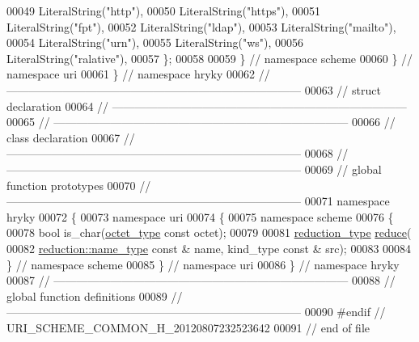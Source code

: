 \begin{DoxyCode}
00049         LiteralString(\textcolor{stringliteral}{"http"}),
00050         LiteralString(\textcolor{stringliteral}{"https"}),
00051         LiteralString(\textcolor{stringliteral}{"fpt"}),
00052         LiteralString(\textcolor{stringliteral}{"ldap"}),
00053         LiteralString(\textcolor{stringliteral}{"mailto"}),
00054         LiteralString(\textcolor{stringliteral}{"urn"}),
00055         LiteralString(\textcolor{stringliteral}{"ws"}),
00056         LiteralString(\textcolor{stringliteral}{"ralative"}),
00057     \};
00058 
00059 \} \textcolor{comment}{// namespace scheme}
00060 \} \textcolor{comment}{// namespace uri}
00061 \} \textcolor{comment}{// namespace hryky}
00062 \textcolor{comment}{//
      ------------------------------------------------------------------------------}
00063 \textcolor{comment}{// struct declaration}
00064 \textcolor{comment}{//
      ------------------------------------------------------------------------------}
00065 \textcolor{comment}{//
      ------------------------------------------------------------------------------}
00066 \textcolor{comment}{// class declaration}
00067 \textcolor{comment}{//
      ------------------------------------------------------------------------------}
00068 \textcolor{comment}{//
      ------------------------------------------------------------------------------}
00069 \textcolor{comment}{// global function prototypes}
00070 \textcolor{comment}{//
      ------------------------------------------------------------------------------}
00071 \textcolor{keyword}{namespace }hryky
00072 \{
00073 \textcolor{keyword}{namespace }uri
00074 \{
00075 \textcolor{keyword}{namespace }scheme
00076 \{
00078     \textcolor{keywordtype}{bool} is\_char(\hyperlink{namespacehryky_a488cba8b666be33ccca70e819684e3c8}{octet_type} \textcolor{keyword}{const} octet);
00079 
00081     \hyperlink{namespacehryky_a343a9a4c36a586be5c2693156200eadc}{reduction_type} \hyperlink{namespacehryky_1_1uri_ab4530b241565d82fb0768bb29031858f}{reduce}(
00082         \hyperlink{namespacehryky_1_1reduction_ac686c30a4c8d196bbd0f05629a6b921f}{reduction::name_type} \textcolor{keyword}{const} & name, kind\_type \textcolor{keyword}{const} & src);
00083 
00084 \} \textcolor{comment}{// namespace scheme}
00085 \} \textcolor{comment}{// namespace uri}
00086 \} \textcolor{comment}{// namespace hryky}
00087 \textcolor{comment}{//
      ------------------------------------------------------------------------------}
00088 \textcolor{comment}{// global function definitions}
00089 \textcolor{comment}{//
      ------------------------------------------------------------------------------}
00090 \textcolor{preprocessor}{#endif // URI\_SCHEME\_COMMON\_H\_20120807232523642}
00091 \textcolor{preprocessor}{}\textcolor{comment}{// end of file}
\end{DoxyCode}

